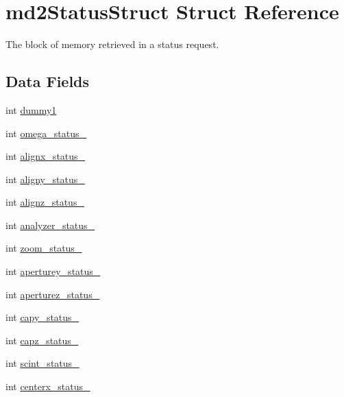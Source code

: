 \hypertarget{structmd2StatusStruct}{\section{md2\-Status\-Struct Struct Reference}
\label{structmd2StatusStruct}
}


The block of memory retrieved in a status request.  


\subsection*{Data Fields}
\begin{DoxyCompactItemize}
\item 
int \hyperlink{structmd2StatusStruct_a3a2dff3e6a1a346806a655e8404e0f53}{dummy1}
\item 
int \hyperlink{structmd2StatusStruct_af6cf3cd65b9ef205685a0d970f168907}{omega\-\_\-status\-\_}
\item 
int \hyperlink{structmd2StatusStruct_a56accf8cb00c59bff87ed75df7dafbbe}{alignx\-\_\-status\-\_}
\item 
int \hyperlink{structmd2StatusStruct_a2f2a11fe2fc7a446323def2be465185a}{aligny\-\_\-status\-\_}
\item 
int \hyperlink{structmd2StatusStruct_aadbfac5709de57e449a37e2937d6ade7}{alignz\-\_\-status\-\_}
\item 
int \hyperlink{structmd2StatusStruct_ab876b484f55bcce576fcd89dcc3f7267}{analyzer\-\_\-status\-\_}
\item 
int \hyperlink{structmd2StatusStruct_af28e978b761dc07eefed3971547cfd4d}{zoom\-\_\-status\-\_}
\item 
int \hyperlink{structmd2StatusStruct_a2ef953eaddf7058bf4276585e6ff066b}{aperturey\-\_\-status\-\_}
\item 
int \hyperlink{structmd2StatusStruct_a27880dd795e1ba4fea4870c64ee3aa84}{aperturez\-\_\-status\-\_}
\item 
int \hyperlink{structmd2StatusStruct_a7f4e945e80b1980b9e69366a69ad79cc}{capy\-\_\-status\-\_}
\item 
int \hyperlink{structmd2StatusStruct_a719db4477f35331eaa8b7b44150e88a2}{capz\-\_\-status\-\_}
\item 
int \hyperlink{structmd2StatusStruct_a1723870357f428ac5c2758a2c9a475c7}{scint\-\_\-status\-\_}
\item 
int \hyperlink{structmd2StatusStruct_aa619cdbd7a563408c6b825ddc4f74ebb}{centerx\-\_\-status\-\_}
\item 

\end{DoxyCompactItemize}
